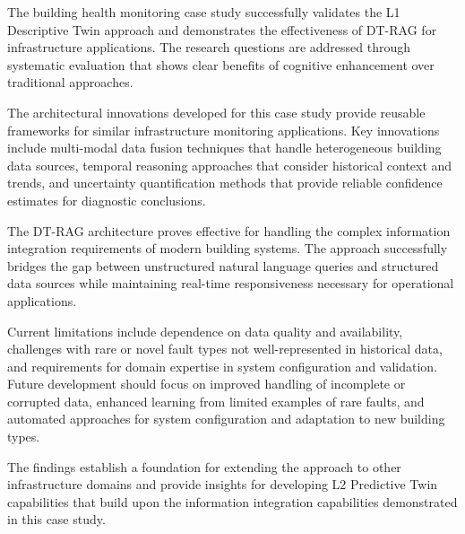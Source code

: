 The building health monitoring case study successfully validates the L1 Descriptive Twin approach and demonstrates the effectiveness of DT-RAG for infrastructure applications. The research questions are addressed through systematic evaluation that shows clear benefits of cognitive enhancement over traditional approaches.

The architectural innovations developed for this case study provide reusable frameworks for similar infrastructure monitoring applications. Key innovations include multi-modal data fusion techniques that handle heterogeneous building data sources, temporal reasoning approaches that consider historical context and trends, and uncertainty quantification methods that provide reliable confidence estimates for diagnostic conclusions.

The DT-RAG architecture proves effective for handling the complex information integration requirements of modern building systems. The approach successfully bridges the gap between unstructured natural language queries and structured data sources while maintaining real-time responsiveness necessary for operational applications.

Current limitations include dependence on data quality and availability, challenges with rare or novel fault types not well-represented in historical data, and requirements for domain expertise in system configuration and validation. Future development should focus on improved handling of incomplete or corrupted data, enhanced learning from limited examples of rare faults, and automated approaches for system configuration and adaptation to new building types.

The findings establish a foundation for extending the approach to other infrastructure domains and provide insights for developing L2 Predictive Twin capabilities that build upon the information integration capabilities demonstrated in this case study.
